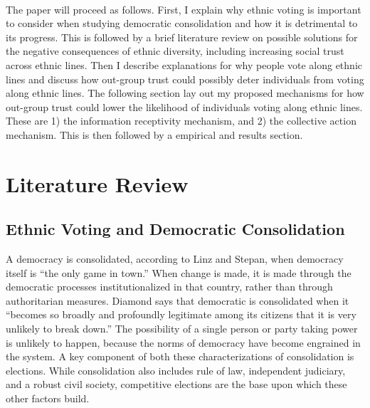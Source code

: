 \documentclass[a4paper, 12pt]{article}
\begin{document}
\paragraph{}
The paper will proceed as follows. First, I explain why ethnic voting is important to consider when studying democratic consolidation and how it is detrimental to its progress. This is followed by a brief literature review on possible solutions for the negative consequences of ethnic diversity, including increasing social trust across ethnic lines. Then I describe explanations for why people vote along ethnic lines and discuss how out-group trust could possibly deter individuals from voting along ethnic lines. The following section lay out my proposed mechanisms for how out-group trust could lower the likelihood of individuals voting along ethnic lines. These are 1) the information receptivity mechanism, and 2) the collective action mechanism. This is then followed by a empirical and results section. 

\section{Literature Review}
\subsection{Ethnic Voting and Democratic Consolidation}
A democracy is consolidated, according to Linz and Stepan\cite{linzBreakdownDemocraticRegimes1978}, when democracy itself is “the only game in town.” When change is made, it is made through the democratic processes institutionalized in that country, rather than through authoritarian measures. Diamond\cite{diamondDemocraticConsolidation1994} says that democratic is consolidated when it “becomes so broadly and profoundly legitimate among its citizens that it is very unlikely to break down.” The possibility of a single person or party taking power is unlikely to happen, because the norms of democracy have become engrained in the system. A key component of both these characterizations of consolidation is elections. While consolidation also includes rule of law, independent judiciary, and a robust civil society, competitive elections are the base upon which these other factors build\cite{linzConsolidatedDemocracies1996}.
\end{document}

